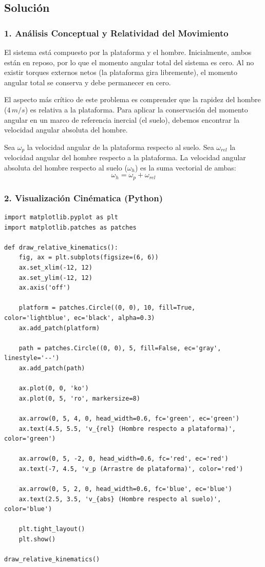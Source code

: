\documentclass[12pt, a4paper]{article}
\begin{document}
\subsection*{Solución}

\subsubsection*{1. Análisis Conceptual y Relatividad del Movimiento}
El sistema está compuesto por la plataforma y el hombre. Inicialmente, ambos están en reposo, por lo que el momento angular total del sistema es cero. Al no existir torques externos netos (la plataforma gira libremente), el momento angular total se conserva y debe permanecer en cero.

El aspecto más crítico de este problema es comprender que la rapidez del hombre ($4 \, \si{m/s}$) es relativa a la plataforma. Para aplicar la conservación del momento angular en un marco de referencia inercial (el suelo), debemos encontrar la velocidad angular absoluta del hombre.

Sea $\omega_p$ la velocidad angular de la plataforma respecto al suelo.
Sea $\omega_{rel}$ la velocidad angular del hombre respecto a la plataforma.
La velocidad angular absoluta del hombre respecto al suelo ($\omega_h$) es la suma vectorial de ambas:
$$\omega_h = \omega_p + \omega_{rel}$$

\subsubsection*{2. Visualización Cinématica (Python)}
\begin{lstlisting}
import matplotlib.pyplot as plt
import matplotlib.patches as patches

def draw_relative_kinematics():
    fig, ax = plt.subplots(figsize=(6, 6))
    ax.set_xlim(-12, 12)
    ax.set_ylim(-12, 12)
    ax.axis('off')

    platform = patches.Circle((0, 0), 10, fill=True, color='lightblue', ec='black', alpha=0.3)
    ax.add_patch(platform)

    path = patches.Circle((0, 0), 5, fill=False, ec='gray', linestyle='--')
    ax.add_patch(path)

    ax.plot(0, 0, 'ko')
    ax.plot(0, 5, 'ro', markersize=8)

    ax.arrow(0, 5, 4, 0, head_width=0.6, fc='green', ec='green')
    ax.text(4.5, 5.5, 'v_{rel} (Hombre respecto a plataforma)', color='green')

    ax.arrow(0, 5, -2, 0, head_width=0.6, fc='red', ec='red')
    ax.text(-7, 4.5, 'v_p (Arrastre de plataforma)', color='red')

    ax.arrow(0, 5, 2, 0, head_width=0.6, fc='blue', ec='blue')
    ax.text(2.5, 3.5, 'v_{abs} (Hombre respecto al suelo)', color='blue')

    plt.tight_layout()
    plt.show()

draw_relative_kinematics()
\end{lstlisting}
\end{document}
